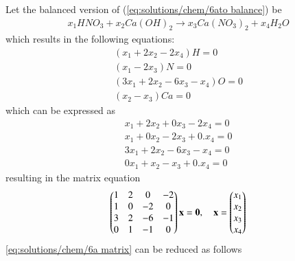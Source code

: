 Let the balanced version of (\ref{eq:solutions/chem/6ato balance}) be
\begin{align}
    \label{eq:solutions/chem/6abalanced}x_{1}HNO_{3}+ x_{2}Ca(OH)_{2} \to x_{3}Ca(NO_{3})_{2}+ x_{4}H_{2}O
\end{align}
which results in the following equations:
\begin{align}
    (x_{1}+ 2x_{2}-2x_{4}) H= 0\\
    (x_{1}-2x_{3}) N= 0\\
    (3x_{1}+ 2x_{2}-6x_{3}- x_{4}) O=0\\
    (x_{2}-x_{3}) Ca= 0
\end{align}
which can be expressed as
\begin{align}
    x_{1}+ 2x_{2}+ 0 x_{3} -2x_{4} = 0\\
    x_{1}+ 0 x_{2} -2x_{3} +0.x_{4}= 0\\
    3x_{1}+ 2x_{2}-6x_{3}- x_{4} =0\\
    0 x_{1} +x_{2}-x_{3} +0.x_{4}= 0
\end{align}
resulting in the matrix equation
\begin{align}
    \label{eq:solutions/chem/6a matrix}
    \begin{pmatrix}1 & 2 & 0 & -2\\
           1 & 0 & -2 & 0\\
           3 & 2 & -6 & -1\\
           0 & 1 & -1 & 0\end{pmatrix}\mathbf{x}
           =\mathbf{0}, \quad
   \mathbf{x}= \begin{pmatrix}x_{1}\\x_{2}\\x_{3}\\x_{4}\end{pmatrix}
\end{align}
%
\eqref{eq:solutions/chem/6a matrix} can be reduced as follows
